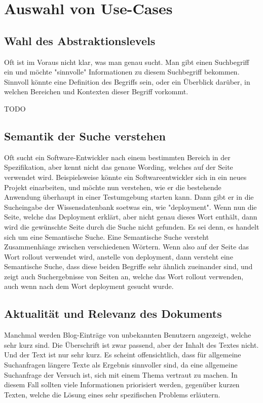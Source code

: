 \chapter{Auswahl von Use-Cases}

\section{Wahl des Abstraktionslevels}
Oft ist im Voraus nicht klar, was man genau sucht. Man gibt einen Suchbegriff ein und möchte "sinnvolle" Informationen zu diesem Suchbegriff bekommen. Sinnvoll könnte eine Definition des Begriffs sein, oder ein Überblick darüber, in welchen Bereichen und Kontexten dieser Begriff vorkommt.

TODO

\section{Semantik der Suche verstehen}
Oft sucht ein Software-Entwickler nach einem bestimmten Bereich in der Spezifikation, aber kennt nicht das genaue Wording, welches auf der Seite verwendet wird.
Beispielsweise könnte ein Softwareentwickler sich in ein neues Projekt einarbeiten, und möchte nun verstehen, wie er die bestehende Anwendung überhaupt in einer Testumgebung starten kann.
Dann gibt er in die Sucheingabe der Wissensdatenbank soetwas ein, wie "deployment".
Wenn nun die Seite, welche das Deployment erklärt, aber nicht genau dieses Wort enthält, dann wird die gewünschte Seite durch die Suche nicht gefunden.
Es sei denn, es handelt sich um eine Semantische Suche.
Eine Semantische Suche versteht Zusammenhänge zwischen verschiedenen Wörtern.
Wenn also auf der Seite das Wort rollout verwendet wird, anstelle von deployment, dann versteht eine Semantische Suche, dass diese beiden Begriffe sehr ähnlich zueinander sind, und zeigt auch Suchergebnisse von Seiten an, welche das Wort rollout verwenden, auch wenn nach dem Wort deployment gesucht wurde.

\section{Aktualität und Relevanz des Dokuments}
Manchmal werden Blog-Einträge von unbekannten Benutzern angezeigt, welche sehr kurz sind.
Die Überschrift ist zwar passend, aber der Inhalt des Textes nicht.
Und der Text ist nur sehr kurz.
Es scheint offensichtlich, dass für allgemeine Suchanfragen längere Texte als Ergebnis sinnvoller sind, da eine allgemeine Suchanfrage der Versuch ist, sich mit einem Thema vertraut zu machen.
In diesem Fall sollten viele Informationen priorisiert werden, gegenüber kurzen Texten, welche die Lösung eines sehr spezifischen Problems erläutern.\\

